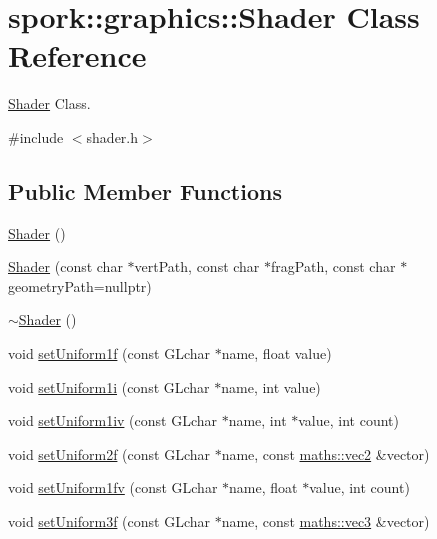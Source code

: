 \hypertarget{classspork_1_1graphics_1_1_shader}{}\section{spork\+:\+:graphics\+:\+:Shader Class Reference}
\label{classspork_1_1graphics_1_1_shader}


\hyperlink{classspork_1_1graphics_1_1_shader}{Shader} Class.  




{\ttfamily \#include $<$shader.\+h$>$}

\subsection*{Public Member Functions}
\begin{DoxyCompactItemize}
\item 
\hyperlink{classspork_1_1graphics_1_1_shader_ad07f4c0a9721d13c9a3330ccc83f8405}{Shader} ()
\item 
\hyperlink{classspork_1_1graphics_1_1_shader_a14fbd32bddfed0666e957d6377a745a9}{Shader} (const char $\ast$vert\+Path, const char $\ast$frag\+Path, const char $\ast$geometry\+Path=nullptr)
\item 
\hyperlink{classspork_1_1graphics_1_1_shader_a5c999f2993935905b276cc90e1b83ca8}{$\sim$\+Shader} ()
\item 
void \hyperlink{classspork_1_1graphics_1_1_shader_a486a5b4ebc281939211eaacb85a2fd93}{set\+Uniform1f} (const G\+Lchar $\ast$name, float value)
\item 
void \hyperlink{classspork_1_1graphics_1_1_shader_a589ba3d50686c9ce540db9e974b5fc70}{set\+Uniform1i} (const G\+Lchar $\ast$name, int value)
\item 
void \hyperlink{classspork_1_1graphics_1_1_shader_a843892caad17a39b03df675ae1fa268c}{set\+Uniform1iv} (const G\+Lchar $\ast$name, int $\ast$value, int count)
\item 
void \hyperlink{classspork_1_1graphics_1_1_shader_aefb625d58b7cec854102f8a6c36fab90}{set\+Uniform2f} (const G\+Lchar $\ast$name, const \hyperlink{structspork_1_1maths_1_1vec2}{maths\+::vec2} \&vector)
\item 
void \hyperlink{classspork_1_1graphics_1_1_shader_a3f8da01159682ede6b4ae15b02e0277f}{set\+Uniform1fv} (const G\+Lchar $\ast$name, float $\ast$value, int count)
\item 
void \hyperlink{classspork_1_1graphics_1_1_shader_a70b750aa20eec302d038e7764d3702b4}{set\+Uniform3f} (const G\+Lchar $\ast$name, const \hyperlink{structspork_1_1maths_1_1vec3}{maths\+::vec3} \&vector)

\end{DoxyCompactItemize}
